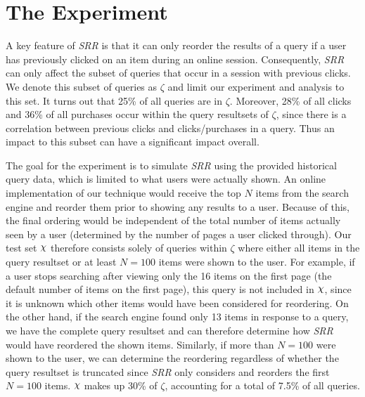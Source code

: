 \documentclass{article}
\def\Chi{\raisebox{2pt}{$\chi$}}
\begin{document}
\section{The Experiment}\label{sec:experiment}
A key feature of {\em SRR} is that it can only reorder the results of a query if
a user has previously clicked on an item during an online session.
Consequently, {\em SRR} can only affect the subset of queries that occur in a
session with previous clicks. We denote this subset of queries as $\zeta$ and
limit our experiment and analysis to this set. It turns out that 25\% of all
queries are in $\zeta$. Moreover, 28\% of all clicks and 36\% of all purchases
occur within the query resultsets of $\zeta$, since there is a correlation
between previous clicks and clicks/purchases in a query.  Thus an impact to this
subset can have a significant impact overall.

The goal for the experiment is to simulate {\em SRR} using the provided
historical query data, which is limited to what users were actually shown. An
online implementation of our technique would receive the top $N$ items from the
search engine and reorder them prior to showing any results to a user. Because
of this, the final ordering would be independent of the total number of items
actually seen by a user (determined by the number of pages a user clicked
through).  Our test set $\Chi$ therefore consists solely of queries within
$\zeta$ where either all items in the query resultset or at least $N=100$ items
were shown to the user. For example, if a user stops searching after viewing
only the 16 items on the first page (the default number of items on the first
page), this query is not included in $\Chi$, since it is unknown which other
items would have been considered for reordering. On the other hand, if the
search engine found only 13 items in response to a query,  we have the complete
query resultset and can therefore determine how {\em SRR} would have reordered
the shown items. Similarly, if more than $N=100$ were shown to the user, we can
determine the reordering regardless of whether the query resultset is truncated
since {\em SRR} only considers and reorders the first $N=100$ items. $\Chi$
makes up 30\% of $\zeta$, accounting for a total of 7.5\% of all queries.
\end{document}
